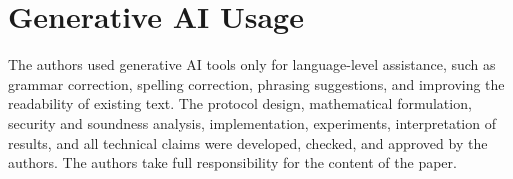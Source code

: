 \section{Generative AI Usage}\label{sec:generative-ai-usage}
The authors used generative AI tools only for language-level assistance, such as
grammar correction, spelling correction, phrasing suggestions, and improving the
readability of existing text. The protocol design, mathematical formulation,
security and soundness analysis, implementation, experiments, interpretation of
results, and all technical claims were developed, checked, and approved by the
authors. The authors take full responsibility for the content of the paper.

